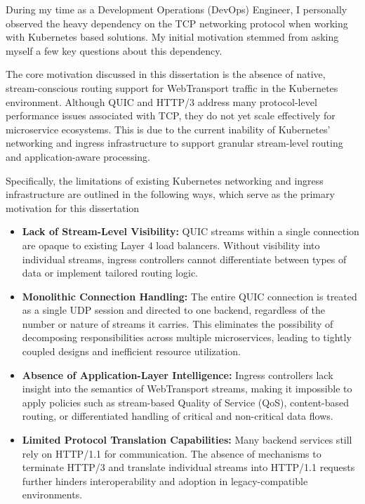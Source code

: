 During my time as a Development Operations (DevOps) Engineer, I personally observed the heavy dependency on the TCP networking protocol when working with Kubernetes based solutions. My initial motivation stemmed from asking myself a few key questions about this dependency.

The core motivation discussed in this dissertation is the absence of native, stream-conscious routing support for WebTransport traffic in the Kubernetes environment. Although QUIC and HTTP/3 address many protocol-level performance issues associated with TCP, they do not yet scale effectively for microservice ecosystems. This is due to the current inability of Kubernetes’ networking and ingress infrastructure to support granular stream-level routing and application-aware processing.

Specifically, the limitations of existing Kubernetes networking and ingress infrastructure are outlined in the following ways, which serve as the primary motivation for this dissertation

\begin{itemize}
\item \textbf{Lack of Stream-Level Visibility:} QUIC streams within a single connection are opaque to existing Layer 4 load balancers. Without visibility into individual streams, ingress controllers cannot differentiate between types of data or implement tailored routing logic.

\item \textbf{Monolithic Connection Handling:} The entire QUIC connection is treated as a single UDP session and directed to one backend, regardless of the number or nature of streams it carries. This eliminates the possibility of decomposing responsibilities across multiple microservices, leading to tightly coupled designs and inefficient resource utilization.

\item \textbf{Absence of Application-Layer Intelligence:} Ingress controllers lack insight into the semantics of WebTransport streams, making it impossible to apply policies such as stream-based Quality of Service (QoS), content-based routing, or differentiated handling of critical and non-critical data flows.

\item \textbf{Limited Protocol Translation Capabilities:} Many backend services still rely on HTTP/1.1 for communication. The absence of mechanisms to terminate HTTP/3 and translate individual streams into HTTP/1.1 requests further hinders interoperability and adoption in legacy-compatible environments.


\end{itemize}

